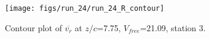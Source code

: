 \begin{figure}[H]
\centering
\texttt{[image: figs/run\_24/run\_24\_R\_contour]}
\caption{Contour plot of $\overline{v_{r}}$ at $z/c$=7.75, $V_{free}$=21.09, station 3.}
\label{fig:run_24_R_contour}
\end{figure}



